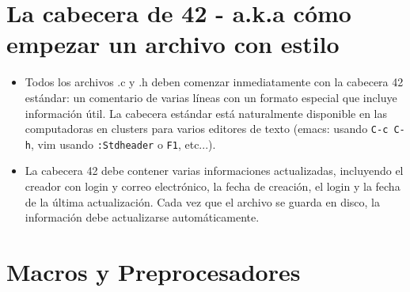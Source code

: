 \documentclass{42-es}
\begin{document}

\section{La cabecera de 42 - a.k.a cómo empezar un archivo con estilo}

\begin{itemize}
      \item Todos los archivos .c y .h deben comenzar inmediatamente con la
            cabecera 42 estándar: un comentario de varias líneas con un formato
            especial
            que incluye información útil. La cabecera estándar está
            naturalmente
            disponible
            en las computadoras en clusters para varios editores de texto
            (emacs:
            usando
            \texttt{C-c C-h}, vim usando \texttt{:Stdheader} o \texttt{F1},
            etc...).
      \item La cabecera 42 debe contener varias informaciones actualizadas,
            incluyendo
            el creador con login y correo electrónico, la fecha de creación, el
            login y
            la fecha de la última actualización. Cada vez que el archivo se
            guarda en
            disco, la información debe actualizarse automáticamente.
\end{itemize}
\newpage

\section{Macros y Preprocesadores}
\end{document}
